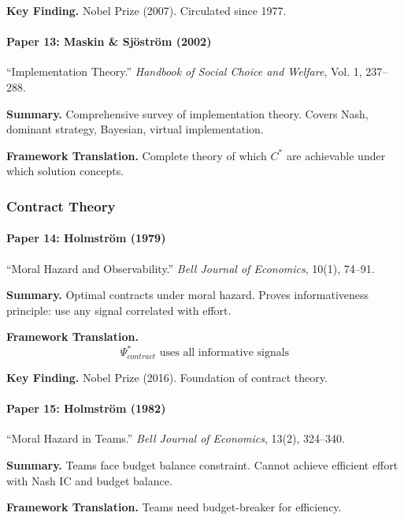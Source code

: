 \textbf{Key Finding.}
Nobel Prize (2007). Circulated since 1977.

\paragraph{Paper 13: Maskin \& Sjöström (2002)}

``Implementation Theory.''
\textit{Handbook of Social Choice and Welfare}, Vol. 1, 237--288.

\textbf{Summary.}
Comprehensive survey of implementation theory. Covers Nash, dominant 
strategy, Bayesian, virtual implementation.

\textbf{Framework Translation.}
Complete theory of which $C^*$ are achievable under which solution concepts.

\subsubsection{Contract Theory}

\paragraph{Paper 14: Holmström (1979)}

``Moral Hazard and Observability.''
\textit{Bell Journal of Economics}, 10(1), 74--91.

\textbf{Summary.}
Optimal contracts under moral hazard. Proves informativeness principle:
use any signal correlated with effort.

\textbf{Framework Translation.}
\begin{equation}
\Psi^*_{contract} \text{ uses all informative signals}
\end{equation}

\textbf{Key Finding.}
Nobel Prize (2016). Foundation of contract theory.

\paragraph{Paper 15: Holmström (1982)}

``Moral Hazard in Teams.''
\textit{Bell Journal of Economics}, 13(2), 324--340.

\textbf{Summary.}
Teams face budget balance constraint. Cannot achieve efficient effort 
with Nash IC and budget balance.

\textbf{Framework Translation.}
Teams need budget-breaker for efficiency.


